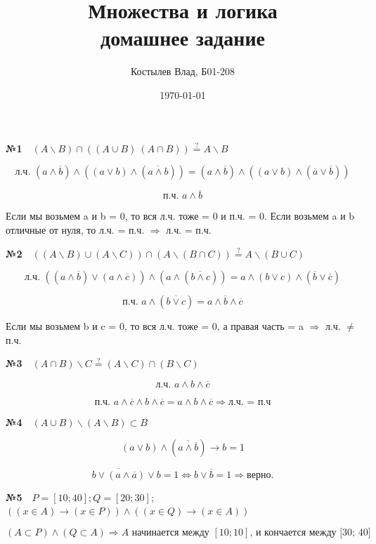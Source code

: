 \documentclass[a4paper, 12pt]{article}
\author{Костылев Влад, Б01-208}
\date{\today}
\title{\textbf{Множества и логика} \\ 
	домашнее задание}
\begin{document}
	\maketitle
	
	\textbf{№1}\
	\
	$(A \backslash B) \cap ((A \cup B) \ (A \cap B)) \stackrel{?}{=} A \backslash B$
	
	\[
	\text{л.ч. } (a \wedge \overline{b}) \wedge ((a \vee b)\wedge (\overline{a \wedge b})) = (a \wedge \overline{b}) \wedge ((a \vee b) \wedge (\overline{a} \vee \overline{b}))
	\]
	
	\[
	\text{п.ч. } a \wedge \overline{b}
	\]
	
	Если мы возьмем a и b = 0, то вся л.ч. тоже = 0 и п.ч. = 0. Если возьмем a и b отличные от нуля, то л.ч. = п.ч. $\Rightarrow$ л.ч. = п.ч.
	
	\textbf{№2}\
	\
	$( (A \backslash B) \cup (A \backslash C) ) \cap (A \backslash (B \cap C)) \stackrel{?}{=} A \backslash (B \cup C)$
	
	\[
	\text{л.ч. }
	((a \wedge \overline{b}) \vee (a \wedge \overline{c})) \wedge (a \wedge (\overline{b \wedge c})) = a \wedge (b \vee c) \wedge (\overline{b} \vee \overline{c})
	\]
	
	\[
	\text{п.ч. }
	a \wedge (\overline{b \vee c}) = a \wedge \overline{b} \wedge \overline{c} 
	\]
	
	Если мы возьмем b и c = 0, то вся л.ч. тоже = 0, а правая часть = a $\Rightarrow$ л.ч. $\not=$ п.ч.
	
	\textbf{№3}\
	\
	$(A \cap B) \backslash C \stackrel{?}{=} (A \backslash C) \cap (B \backslash C)$
	
	\[
	\text{л.ч. }
	a \wedge b \wedge \overline{c}
	\]
	
	\[
	\text{п.ч. }
	a \wedge \overline{c} \wedge b \wedge \overline{c} = a \wedge b \wedge \overline{c} \Rightarrow \text{л.ч. = п.ч}
	\]
	
	\textbf{№4}\
	\
	$(A \cup B) \backslash (A \backslash B) \subset B$
	
	\[
	(a \vee b) \wedge (\overline{a \wedge \overline{b}}) \rightarrow b = 1
	\]
	
	\[
	\overline{b \vee (a \wedge \overline{a})} \vee b = 1 \Leftrightarrow b \vee \overline{b} = 1 \Rightarrow верно. 
	\]
	
	\textbf{№5}\
	\
	$P = [10; 40]; Q = [20; 30];$
	$((x \in A) \rightarrow (x \in P)) \wedge ((x \in Q) \rightarrow (x \in A))$ 
	
	\[
	(A \subset P) \wedge (Q \subset A) \Rightarrow A \text{ начинается между $[10; 10]$, и кончается между [30; 40]} 
	\]
	
\end{document}
